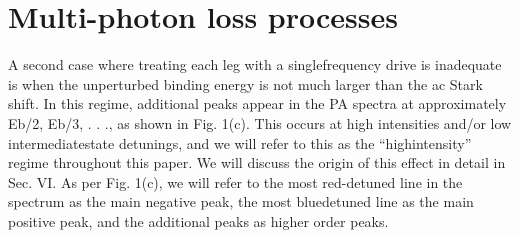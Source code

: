 \section{Multi-photon loss processes} \label{sec:highE_coupling}
A second case where treating each leg with a singlefrequency drive is inadequate is when the unperturbed
binding energy is not much larger than the ac Stark shift.
In this regime, additional peaks appear in the PA spectra
at approximately Eb/2, Eb/3, . . ., as shown in Fig. 1(c).
This occurs at high intensities and/or low intermediatestate detunings, and we will refer to this as the “highintensity” regime throughout this paper. We will discuss the origin of this effect in detail in Sec. VI. As per
Fig. 1(c), we will refer to the most red-detuned line in
the spectrum as the main negative peak, the most bluedetuned line as the main positive peak, and the additional peaks as higher order peaks.
